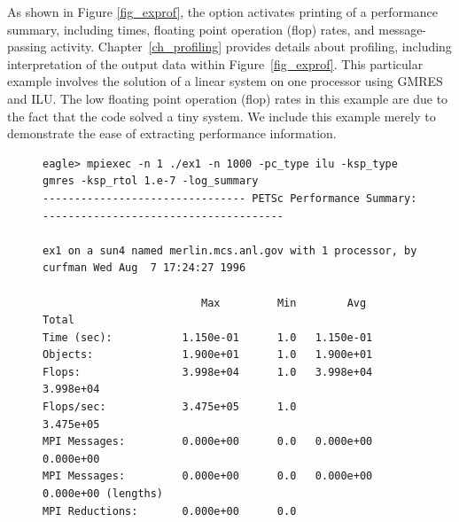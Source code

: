 As shown in Figure \ref{fig_exprof}, the option  activates printing of a performance summary, including
times, floating point operation (flop) rates, and message-passing
activity.  Chapter~\ref{ch_profiling}
provides details about profiling, including interpretation of the
output data within Figure~\ref{fig_exprof}.  This particular example involves the solution of a linear
system on one processor using GMRES and ILU.  The low floating point
operation (flop) rates in this example are due to the fact that the
code solved a tiny system.  We include this example merely to
demonstrate the ease of extracting performance information.

\begin{figure}[H]
{\footnotesize
\begin{verbatim}
eagle> mpiexec -n 1 ./ex1 -n 1000 -pc_type ilu -ksp_type gmres -ksp_rtol 1.e-7 -log_summary
-------------------------------- PETSc Performance Summary: --------------------------------------

ex1 on a sun4 named merlin.mcs.anl.gov with 1 processor, by curfman Wed Aug  7 17:24:27 1996

                         Max         Min        Avg        Total 
Time (sec):           1.150e-01      1.0   1.150e-01
Objects:              1.900e+01      1.0   1.900e+01
Flops:                3.998e+04      1.0   3.998e+04  3.998e+04
Flops/sec:            3.475e+05      1.0              3.475e+05
MPI Messages:         0.000e+00      0.0   0.000e+00  0.000e+00
MPI Messages:         0.000e+00      0.0   0.000e+00  0.000e+00 (lengths)
MPI Reductions:       0.000e+00      0.0


\end{verbatim}}
\end{figure}
